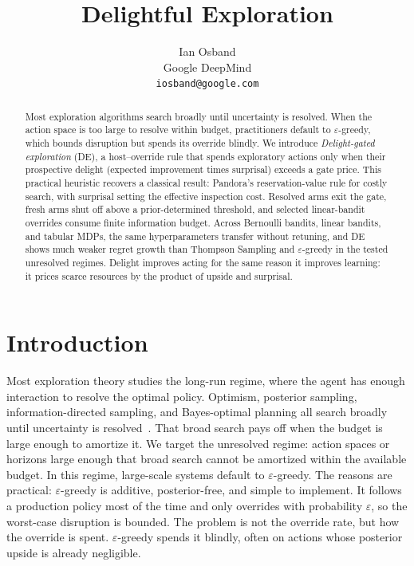 \documentclass{article}
\title{Delightful Exploration}
\author{%
  Ian Osband \\
  Google DeepMind \\
  \texttt{iosband@google.com} \\
}
\begin{document}
\maketitle


\begin{abstract}
Most exploration algorithms search broadly until uncertainty is resolved.
When the action space is too large to resolve within budget, practitioners default to $\varepsilon$-greedy, which bounds disruption but spends its override blindly.
We introduce \textit{Delight-gated exploration} (DE), a host--override rule that spends exploratory actions only when their prospective delight (expected improvement times surprisal) exceeds a gate price.
This practical heuristic recovers a classical result: Pandora's reservation-value rule for costly search, with surprisal setting the effective inspection cost.
Resolved arms exit the gate, fresh arms shut off above a prior-determined threshold, and selected linear-bandit overrides consume finite information budget.
Across Bernoulli bandits, linear bandits, and tabular MDPs, the same hyperparameters transfer without retuning, and DE shows much weaker regret growth than Thompson Sampling and $\varepsilon$-greedy in the tested unresolved regimes.
Delight improves acting for the same reason it improves learning: it prices scarce resources by the product of upside and surprisal.
\end{abstract}



\section{Introduction}
\label{sec:intro}

Most exploration theory studies the long-run regime, where the agent has enough interaction to resolve the optimal policy.
Optimism, posterior sampling, information-directed sampling, and Bayes-optimal planning all search broadly until uncertainty is resolved~\citep{lattimore2020bandit,russo2014ids}.
That broad search pays off when the budget is large enough to amortize it.
We target the unresolved regime: action spaces or horizons large enough that broad search cannot be amortized within the available budget.
In this regime, large-scale systems default to $\varepsilon$-greedy.
The reasons are practical: $\varepsilon$-greedy is additive, posterior-free, and simple to implement.
It follows a production policy most of the time and only overrides with probability $\varepsilon$, so the worst-case disruption is bounded.
The problem is not the override rate, but how the override is spent.
$\varepsilon$-greedy spends it blindly, often on actions whose posterior upside is already negligible.
\end{document}
